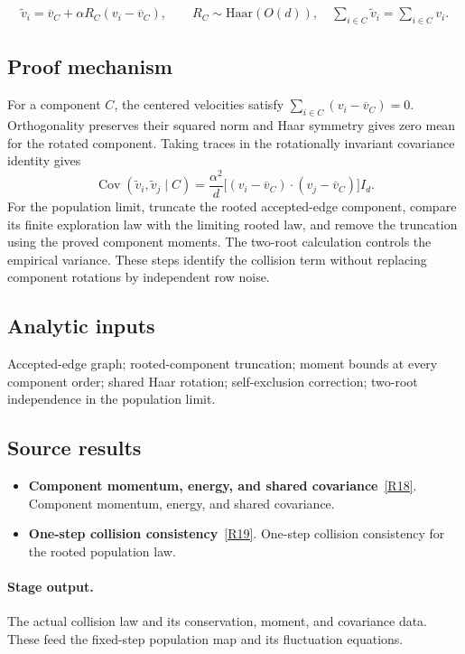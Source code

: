 \documentclass[11pt,a4paper]{article}
\begin{document}
\begin{gather*}
\widetilde v_i=\overline v_C+\alpha R_C(v_i-\overline v_C),\qquad R_C\sim\mathrm{Haar}(O(d)),
\quad \sum_{i\in C}\widetilde v_i=\sum_{i\in C}v_i.
\end{gather*}
\subsection*{Proof mechanism}
For a component \(C\), the centered velocities satisfy \(\sum_{i\in C}(v_i-\overline v_C)=0\). Orthogonality preserves their squared norm and Haar symmetry gives zero mean for the rotated component. Taking traces in the rotationally invariant covariance identity gives
\[\operatorname{Cov}(\widetilde v_i,\widetilde v_j\mid C)
=\frac{\alpha^2}{d}\bigl[(v_i-\overline v_C)\cdot(v_j-\overline v_C)\bigr]I_d.\]
For the population limit, truncate the rooted accepted-edge component, compare its finite exploration law with the limiting rooted law, and remove the truncation using the proved component moments. The two-root calculation controls the empirical variance. These steps identify the collision term without replacing component rotations by independent row noise.
\subsection*{Analytic inputs}
Accepted-edge graph; rooted-component truncation; moment bounds at every component order; shared Haar rotation; self-exclusion correction; two-root independence in the population limit.
\subsection*{Source results}
\begin{itemize}
\item \textbf{Component momentum, energy, and shared covariance}~\hyperref[src:thm-mean-field-component-identities]{[R18]}. Component momentum, energy, and shared covariance.
\item \textbf{One-step collision consistency}~\hyperref[src:thm-mean-field-one-step-consistency]{[R19]}. One-step collision consistency for the rooted population law.
\end{itemize}
\paragraph{Stage output.} The actual collision law and its conservation, moment, and covariance data. These feed the fixed-step population map and its fluctuation equations.
\end{document}
